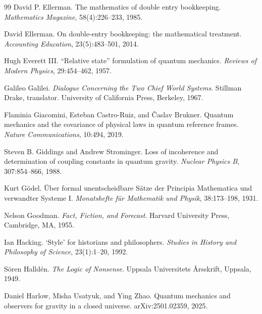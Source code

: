 \documentclass[11pt,a4paper]{article}
\theoremstyle{remark}\newtheorem{remark}[definition]{Remark}
\begin{document}
\begin{thebibliography}{99}
David P. Ellerman.
\newblock The mathematics of double entry bookkeeping.
\newblock \emph{Mathematics Magazine}, 58(4):226--233, 1985.

David Ellerman.
\newblock On double-entry bookkeeping: the mathematical treatment.
\newblock \emph{Accounting Education}, 23(5):483--501, 2014.

Hugh Everett III.
\newblock ``Relative state'' formulation of quantum mechanics.
\newblock \emph{Reviews of Modern Physics}, 29:454--462, 1957.

Galileo Galilei.
\newblock \emph{Dialogue Concerning the Two Chief World Systems}.
\newblock Stillman Drake, translator. University of California Press, Berkeley, 1967.

Flaminia Giacomini, Esteban Castro-Ruiz, and \v{C}aslav Brukner.
\newblock Quantum mechanics and the covariance of physical laws in quantum reference frames.
\newblock \emph{Nature Communications}, 10:494, 2019.

Steven B. Giddings and Andrew Strominger.
\newblock Loss of incoherence and determination of coupling constants in quantum gravity.
\newblock \emph{Nuclear Physics B}, 307:854--866, 1988.

Kurt G\"odel.
\newblock \"Uber formal unentscheidbare S\"atze der Principia Mathematica und verwandter Systeme I.
\newblock \emph{Monatshefte f\"ur Mathematik und Physik}, 38:173--198, 1931.

Nelson Goodman.
\newblock \emph{Fact, Fiction, and Forecast}.
\newblock Harvard University Press, Cambridge, MA, 1955.

Ian Hacking.
\newblock `Style' for historians and philosophers.
\newblock \emph{Studies in History and Philosophy of Science}, 23(1):1--20, 1992.

S\"oren Halld\'en.
\newblock \emph{The Logic of Nonsense}.
\newblock Uppsala Universitets \AA rsskrift, Uppsala, 1949.

Daniel Harlow, Misha Usatyuk, and Ying Zhao.
\newblock Quantum mechanics and observers for gravity in a closed universe.
\newblock arXiv:2501.02359, 2025.


\end{thebibliography}
\end{document}
